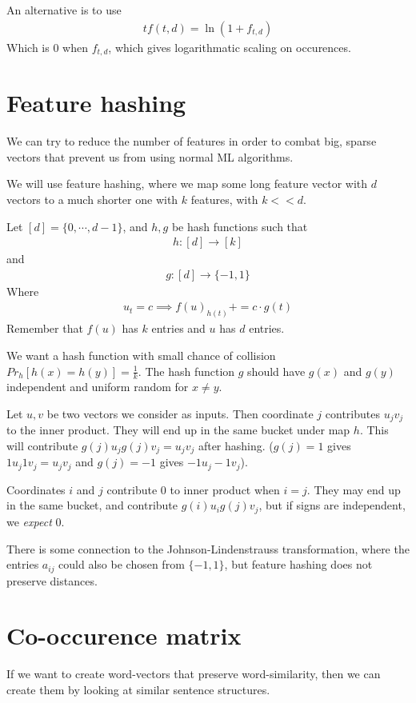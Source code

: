 \documentclass{article}
\begin{document}
        An alternative is to use 
        \begin{align}
          tf(t,d) = \ln(1 + f_{t,d})
        \end{align}
        Which is $0$ when $f_{t,d}$, which gives logarithmatic scaling on occurences.

\section{Feature hashing}
  We can try to reduce the number of features in order to combat big, sparse vectors that prevent us from using normal ML algorithms. 

  We will use feature hashing, where we map some long feature vector with $d$ vectors to a much shorter one with $k$ features, with $k << d$.

  Let $[d] = \{0, \cdots, d-1\}$, and $h, g$ be hash functions such that
  \begin{align}
    h : [d] \rightarrow [k]
  \end{align}
  and 
  \begin{align}
    g : [d] \rightarrow \{-1, 1\}
  \end{align}
  Where 
  \begin{align}
    u_t = c \implies f(u)_{h(t)} += c \cdot g(t)
  \end{align}
  Remember that $f(u)$ has $k$ entries and $u$ has $d$ entries. 

  We want a hash function with small chance of collision $Pr_h[h(x) = h(y)] = \frac{1}{k}$. The hash function $g$ should have $g(x)$ and $g(y)$ independent and uniform random for $x \neq y$. 

  Let $u, v$ be two vectors we consider as inputs. Then coordinate $j$ contributes $u_j v_j$ to the inner product. They will end up in the same bucket under map $h$. This will contribute $g(j)u_j g(j) v_j = u_j v_j$ after hashing. ($g(j) = 1$ gives $1 u_j 1 v_j = u_j v_j$ and $g(j) = -1$ gives $-1 u_j -1 v_j$). 

  Coordinates $i$ and $j$ contribute $0$ to inner product when $i = j$. They may end up in the same bucket, and contribute $g(i) u_i g(j)v_j$, but if signs are independent, we \emph{expect} $0$. 

  There is some connection to the Johnson-Lindenstrauss transformation, where the entries $a_{ij}$ could also be chosen from $\{-1, 1\}$, but feature hashing does not preserve distances.


\section{Co-occurence matrix}
  If we want to create word-vectors that preserve word-similarity, then we can create them by looking at similar sentence structures. 
\end{document}
